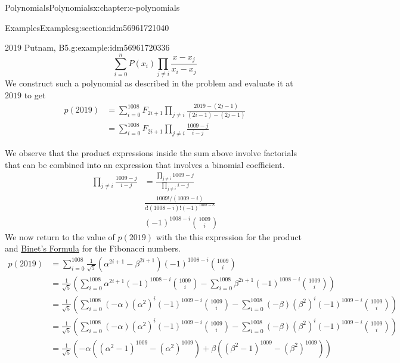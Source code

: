 \documentclass[twoside,10pt,]{book}
\numberwithin{equation}{section}
\begin{document}
\begin{chapterptx}{Polynomials}{}{Polynomials}{}{}{x:chapter:c-polynomials}
\begin{sectionptx}{Examples}{}{Examples}{}{}{g:section:idm56961721040}
\begin{example}{2019 Putnam, B5.}{g:example:idm56961720336}
\begin{equation*}
\sum_{i=0}^n P(x_i) \prod_{j \neq i} \frac{x-x_j}{x_i-x_j}
\end{equation*}
We construct such a polynomial as described in the problem and evaluate it at \(2019\) to get%
\begin{equation*}
\begin{split}
p(2019) &=\sum_{i=0}^{1008} F_{2i+1} \prod_{j \neq i} \frac{2019-(2j-1)}{(2i-1)-(2j-1)}\\
&=\sum_{i=0}^{1008} F_{2i+1} \prod_{j \neq i} \frac{1009-j}{i-j}
\end{split}
\end{equation*}
%
\par
We observe that the product expressions inside the sum above involve factorials that can be combined into an expression that involves a binomial coefficient.%
\begin{equation*}
\begin{split}
\prod_{j \neq i} \frac{1009-j}{i-j}&=\frac{\prod_{j \neq i} {1009-j}}
{\prod_{j \neq i} {i-j}}\\
&\frac{1009!/(1009-i)}{i! (1008-i)! (-1)^{1008-8}}\\
& (-1)^{1008-i}\binom{1009}{i}
\end{split}
\end{equation*}
We now return to the value of \(p(2019)\) with the this expression for the product and \hyperlink{x:exercise:binet}{Binet's Formula} for the Fibonacci numbers.%
\begin{equation*}
\begin{split}
p(2019) &=\sum_{i=0}^{1008} \frac{1}{\sqrt{5}}(\alpha^{2i+1}-\beta^{2i+1}) 
(-1)^{1008-i}\binom{1009}{i}    \\
&=\frac{1}{\sqrt{5}}\left(    
\sum_{i=0}^{1008} \alpha^{2i+1}
(-1)^{1008-i}\binom{1009}{i}-
\sum_{i=0}^{1008} \beta^{2i+1}
(-1)^{1008-i}\binom{1009}{i}
\right)\\
&=\frac{1}{\sqrt{5}}\left(    
\sum_{i=0}^{1008}(-\alpha) (\alpha^2)^i
(-1)^{1009-i}\binom{1009}{i}-
\sum_{i=0}^{1008}(-\beta) (\beta^2)^i
(-1)^{1009-i}\binom{1009}{i}
\right)\\
&=\frac{1}{\sqrt{5}}\left(    
\sum_{i=0}^{1008}(-\alpha) (\alpha^2)^i
(-1)^{1009-i}\binom{1009}{i}-
\sum_{i=0}^{1008}(-\beta) (\beta^2)^i
(-1)^{1009-i}\binom{1009}{i}
\right)\\
&=\frac{1}{\sqrt{5}}\left(-\alpha((\alpha^2-1)^{1009} -(\alpha^2)^{1009} )
+\beta  ((\beta^2-1)^{1009} -(\beta^2)^{1009} )
\right)\\

\end{split}
\end{equation*}
\end{example}
\end{sectionptx}
\end{chapterptx}
\end{document}
